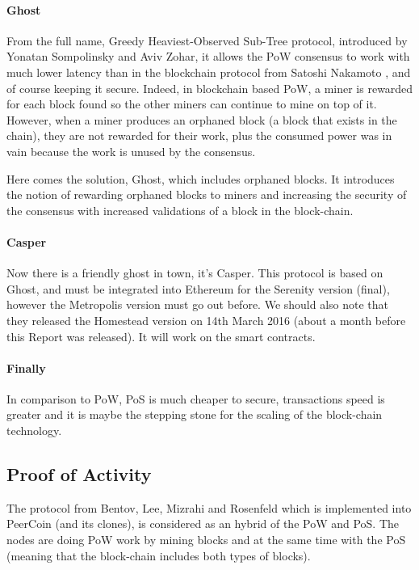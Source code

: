 \paragraph{Ghost}
From the full name, Greedy Heaviest-Observed Sub-Tree protocol, introduced by Yonatan Sompolinsky and Aviv Zohar\cite{Sompolinsky2014AcceleratingChains}, it allows the PoW consensus to work with much lower latency than in the blockchain protocol from Satoshi Nakamoto \cite{SatoshiNakamoto2008Bitcoin:System}, and of course keeping it secure. Indeed, in blockchain based PoW, a miner is rewarded for each block found so the other miners can continue to mine on top of it. However, when a miner produces an orphaned block (a block that exists in the chain), they are not rewarded for their work, plus the consumed power was in vain because the work is unused by the consensus.

Here comes the solution, Ghost, which includes orphaned blocks. It introduces the notion of rewarding orphaned blocks to miners and increasing the security of the consensus with increased validations of a block in the block-chain.

\paragraph{Casper}
Now there is a friendly ghost in town, it's Casper\cite{Buterin2015UnderstandingCasper}. This protocol is based on Ghost, and must be integrated into Ethereum for the Serenity\cite{Buterin2014SlasherStake} version (final), however the Metropolis version must go out before. We should also note that they released the Homestead version on 14th March 2016 (about a month before this Report was released). It will work on the smart contracts.

\paragraph{Finally}
In comparison to PoW, PoS is much cheaper to secure, transactions speed is greater and it is maybe the stepping stone for the scaling of the block-chain technology.

\subsection{Proof of Activity}
The protocol from Bentov, Lee, Mizrahi and Rosenfeld  \cite{Bentov2013ProofStake} which is implemented into PeerCoin (and its clones), is considered as an hybrid of the PoW and PoS. The nodes are doing PoW work by mining blocks and at the same time with the PoS (meaning that the block-chain includes both types of blocks).

